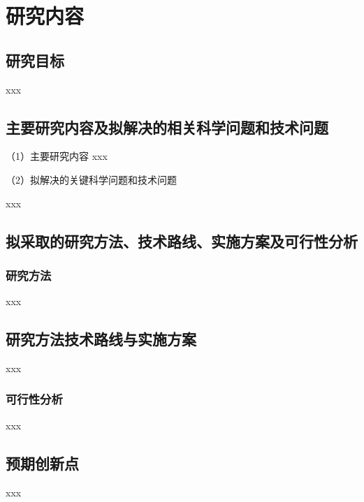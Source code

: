 



\section{研究内容}
\begin{mdframed}[everyline=true]

\subsection{研究目标}
xxx
\end{mdframed}

\begin{mdframed}[everyline=true]
\subsection{主要研究内容及拟解决的相关科学问题和技术问题}
（1）主要研究内容
xxx

（2）拟解决的关键科学问题和技术问题

xxx

\end{mdframed}

\begin{mdframed}[everyline=true]

\subsection{拟采取的研究方法、技术路线、实施方案及可行性分析}
\subsubsection{研究方法}
xxx

\subsection{研究方法技术路线与实施方案}
xxx


\subsubsection{可行性分析}
xxx

\end{mdframed}

\begin{mdframed}[everyline=true]
\subsection{预期创新点}
xxx\\[8cm]

\end{mdframed}


